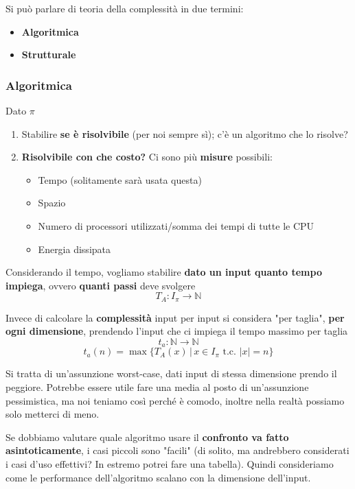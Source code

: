 \documentclass[11pt]{article}
\begin{document}
	Si può parlare di teoria della complessità in due termini:
	\begin{itemize}
		\item \textbf{Algoritmica}
		\item \textbf{Strutturale}
	\end{itemize}
	
	
	\subsubsection{Algoritmica}
	
	Dato $\pi$
	\begin{enumerate}
		\item Stabilire \textbf{se è risolvibile} (per noi sempre sì); c'è un algoritmo che lo risolve?
		
		\item \textbf{Risolvibile con che costo?} Ci sono più \textbf{misure} possibili:
		\begin{itemize}
			\item Tempo (solitamente sarà usata questa)
			\item Spazio
			\item Numero di processori utilizzati/somma dei tempi di tutte le CPU
			\item Energia dissipata
		\end{itemize}
	\end{enumerate}
	
	Considerando il tempo, vogliamo stabilire \textbf{dato un input quanto tempo impiega}, ovvero \textbf{quanti passi} deve svolgere
	$$ T_A : I_\pi \rightarrow \mathbb{N}$$
	
	Invece di calcolare la \textbf{complessità} input per input si considera "per taglia", \textbf{per ogni dimensione}, prendendo l'input che ci impiega il tempo massimo per taglia
	$$ t_a : \mathbb{N} \rightarrow \mathbb{N}$$
	$$ t_a (n) = \max \{T_A (x) \, | \, x \in I_\pi \text{ t.c. } |x| = n\} $$
	
	Si tratta di un'assunzione worst-case, dati input di stessa dimensione prendo il peggiore. Potrebbe essere utile fare una media al posto di un'assunzione pessimistica, ma noi teniamo così perché è comodo, inoltre nella realtà possiamo solo metterci di meno.\\
	
	\newpage
	
	Se dobbiamo valutare quale algoritmo usare il \textbf{confronto va fatto asintoticamente}, i casi piccoli sono "facili" (di solito, ma andrebbero considerati i casi d'uso effettivi? In estremo potrei fare una tabella). Quindi consideriamo come le performance dell'algoritmo scalano con la dimensione dell'input.\\
	
\end{document}
